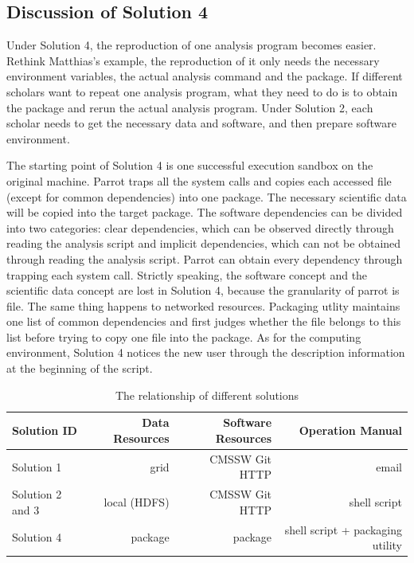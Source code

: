 \documentclass{acm_proc_article-sp}
\begin{document}
\subsection{Discussion of Solution 4} 

Under Solution 4, the reproduction of one analysis program becomes easier.
Rethink Matthias's example, the reproduction of it only needs
the necessary environment variables, the actual analysis command
and the package. If different scholars want to repeat one analysis program,
what they need to do is to obtain the package and rerun the actual analysis
program. Under Solution 2, each scholar needs to get the necessary data and
software, and then prepare software environment. 

The starting point of Solution 4 is one successful execution sandbox on the original machine. 
Parrot traps all the system calls and copies each accessed file (except for common dependencies) into one package.
The necessary scientific data will be copied into the target package.
The software dependencies can be divided into two categories: clear dependencies, which can be observed directly through reading the analysis script and implicit dependencies,
which can not be obtained through reading the analysis script. 
Parrot can obtain every dependency through trapping each system call.
Strictly speaking, the software concept and the scientific data concept are lost in Solution 4, because
the granularity of parrot is file.
The same thing happens to networked resources.
Packaging utlity maintains one list of common dependencies and first judges whether the file belongs to this list before trying to copy one file into the package.
As for the computing environment, Solution 4 notices the new user through the description information at the beginning of the script.

\begin{table}
    \centering
    \begin{tabular}{|l|r|r|r|}
        \hline
        Solution ID & Data Resources & Software Resources & Operation Manual \\ \hline
        Solution 1& grid & CMSSW Git HTTP & email \\ \hline
        Solution 2 and 3& local (HDFS) & CMSSW Git HTTP & shell script \\ \hline
        Solution 4& package & package & shell script + packaging utility \\ \hline
    \end{tabular}
    \caption{The relationship of different solutions}
    \label{table:relationship}
\end{table}
\end{document}
